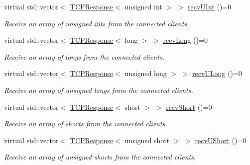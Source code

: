 \begin{DoxyCompactItemize}
virtual std\+::vector$<$ \hyperlink{class_rad_j_a_v_1_1_networking_1_1_t_c_p_response}{T\+C\+P\+Response}$<$ unsigned int $>$ $>$ \hyperlink{class_rad_j_a_v_1_1_networking_1_1_tcpip_server_a05ea2d808e273d6e2cd4561df51323a7}{recv\+U\+Int} ()=0
\begin{DoxyCompactList}\small\item\em Receive an array of unsigned ints from the connected clients. \end{DoxyCompactList}\item 
virtual std\+::vector$<$ \hyperlink{class_rad_j_a_v_1_1_networking_1_1_t_c_p_response}{T\+C\+P\+Response}$<$ long $>$ $>$ \hyperlink{class_rad_j_a_v_1_1_networking_1_1_tcpip_server_aaf828d5448e9ef57b7f5c3748941fb9d}{recv\+Long} ()=0
\begin{DoxyCompactList}\small\item\em Receive an array of longs from the connected clients. \end{DoxyCompactList}\item 
virtual std\+::vector$<$ \hyperlink{class_rad_j_a_v_1_1_networking_1_1_t_c_p_response}{T\+C\+P\+Response}$<$ unsigned long $>$ $>$ \hyperlink{class_rad_j_a_v_1_1_networking_1_1_tcpip_server_abc20c6804ca546955ce5e9e4e7c3f55c}{recv\+U\+Long} ()=0
\begin{DoxyCompactList}\small\item\em Receive an array of unsigned longs from the connected clients. \end{DoxyCompactList}\item 
virtual std\+::vector$<$ \hyperlink{class_rad_j_a_v_1_1_networking_1_1_t_c_p_response}{T\+C\+P\+Response}$<$ short $>$ $>$ \hyperlink{class_rad_j_a_v_1_1_networking_1_1_tcpip_server_a398843f8da75d99ed5ff5c10b5504304}{recv\+Short} ()=0
\begin{DoxyCompactList}\small\item\em Receive an array of shorts from the connected clients. \end{DoxyCompactList}\item 
virtual std\+::vector$<$ \hyperlink{class_rad_j_a_v_1_1_networking_1_1_t_c_p_response}{T\+C\+P\+Response}$<$ unsigned short $>$ $>$ \hyperlink{class_rad_j_a_v_1_1_networking_1_1_tcpip_server_a506ef837d82be03aa3c6bb1c6b44bfc1}{recv\+U\+Short} ()=0
\begin{DoxyCompactList}\small\item\em Receive an array of unsigned shorts from the connected clients. \end{DoxyCompactList}\item 

\end{DoxyCompactItemize}
